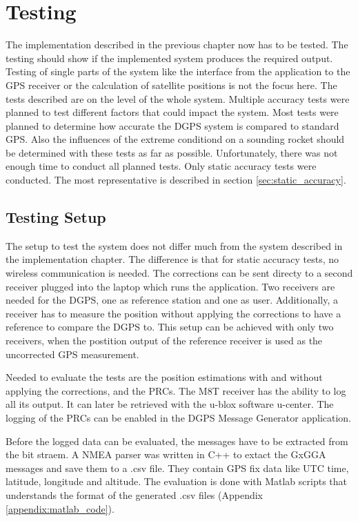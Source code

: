 \chapter{Testing}

The implementation described in the previous chapter now has to be tested.
The testing should show if the implemented system produces the required output.
Testing of single parts of the system like the interface from the application to the GPS receiver or the calculation of satellite positions is not the focus here.
The tests described are on the level of the whole system.
Multiple accuracy tests were planned to test different factors that could impact the system.
Most tests were planned to determine how accurate the DGPS system is compared to standard GPS.
Also the influences of the extreme conditiond on a sounding rocket should be determined with these tests as far as possible.
Unfortunately, there was not enough time to conduct all planned tests.
Only static accuracy tests were conducted.
The most representative is described in section \ref{sec:static_accuracy}.


\section{Testing Setup}

The setup to test the system does not differ much from the system described in the implementation chapter.
The difference is that for static accuracy tests, no wireless communication is needed.
The corrections can be sent directy to a second receiver plugged into the laptop which runs the application.
Two receivers are needed for the DGPS, one as reference station and one as user.
Additionally, a receiver has to measure the position without applying the corrections to have a reference to compare the DGPS to.
This setup can be achieved with only two receivers, when the postition output of the reference receiver is used as the uncorrected GPS measurement.

Needed to evaluate the tests are the position estimations with and without applying the corrections, and the PRCs.
The M8T receiver has the ability to log all its output.
It can later be retrieved with the u-blox software u-center.
The logging of the PRCs can be enabled in the DGPS Message Generator application.

Before the logged data can be evaluated, the messages have to be extracted from the bit straem.
A NMEA parser was written in C++ to extact the GxGGA messages and save them to a .csv file.
They contain GPS fix data like UTC time, latitude, longitude and altitude.
The evaluation is done with Matlab scripts that understands the format of the generated .csv files (Appendix \ref{appendix:matlab_code}).

